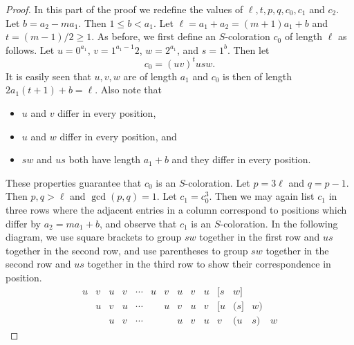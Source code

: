 \documentclass[10pt,a4paper]{amsart}
\begin{document}
\begin{proof}
In this part of the proof we redefine the values of $\ell, t, p, q, c_0, c_1$ and $c_2$. Let $b=a_2-ma_1$. Then $1\leq b<a_1$. Let $\ell=a_1+a_2=(m+1)a_1+b$ and $t=(m-1)/2\geq 1$. As before, we first define an $S$-coloration $c_0$ of length $\ell$ as follows. Let $u=0^{a_1}$, $v=1^{a_1-1}2$, $w=2^{a_1}$, and $s=1^b$. Then let
$$ c_0=(uv)^t usw. $$
It is easily seen that $u,v,w$ are of length $a_1$ and $c_0$ is then of length $2a_1(t+1)+b=\ell$. Also note that 
\begin{itemize}
\item $u$ and $v$ differ in every position,
\item $u$ and $w$ differ in every position, and
\item $sw$ and $us$ both have length $a_1+b$ and they differ in every position. 
\end{itemize}
These properties guarantee that $c_0$ is an $S$-coloration. Let $p=3\ell$ and $q=p-1$. Then $p, q>\ell$ and $\gcd(p, q)=1$. Let $c_1=c_0^3$. Then we may again list $c_1$ in three rows where the adjacent entries in a column correspond to positions which differ by $a_2=ma_1+b$, and observe that $c_1$ is an $S$-coloration. In the following diagram, we use square brackets to group $sw$ together in the first row and $us$ together in the second row, and use parentheses to group $sw$ together in the second row and $us$ together in the third row to show their correspondence in position.
$$  \begin{array}{rccccccccccccl}
u & v & u & v & \cdots & u & v & u & v & u & [s & w] &  & \\
   & u & v & u & \cdots &    & u & v & u & v & [u & (s] & w) & \\
   &    & u & v & \cdots &    &    & u & v & u & v & (u & s) & w
   \end{array}
   $$


\end{proof}
\end{document}
